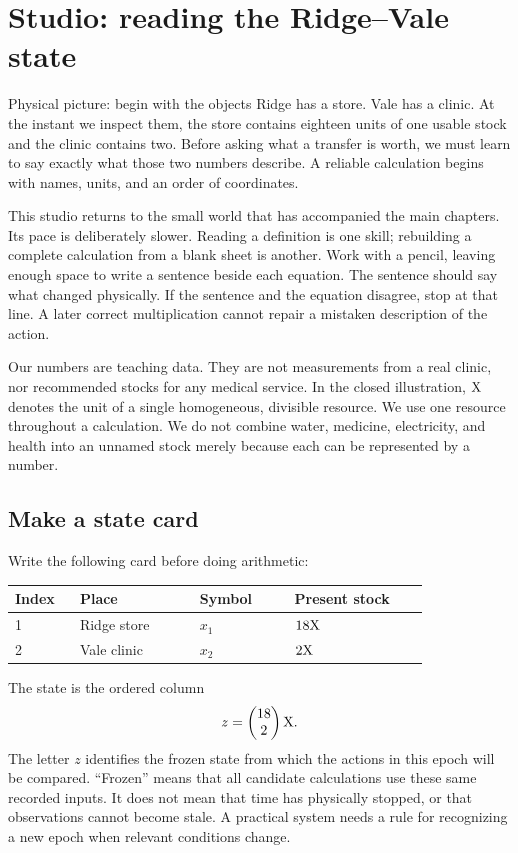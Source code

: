 \chapter{Studio: reading the Ridge--Vale state}\label{ch:studio-state}

\begin{intuitionbox}{Physical picture: begin with the objects}
Ridge has a store. Vale has a clinic. At the instant we inspect them, the store contains eighteen units of one usable stock and the clinic contains two. Before asking what a transfer is worth, we must learn to say exactly what those two numbers describe. A reliable calculation begins with names, units, and an order of coordinates.
\end{intuitionbox}

This studio returns to the small world that has accompanied the main chapters. Its pace is deliberately slower. Reading a definition is one skill; rebuilding a complete calculation from a blank sheet is another. Work with a pencil, leaving enough space to write a sentence beside each equation. The sentence should say what changed physically. If the sentence and the equation disagree, stop at that line. A later correct multiplication cannot repair a mistaken description of the action.

Our numbers are teaching data. They are not measurements from a real clinic, nor recommended stocks for any medical service. In the closed illustration, \(\mathrm{X}\) denotes the unit of a single homogeneous, divisible resource. We use one resource throughout a calculation. We do not combine water, medicine, electricity, and health into an unnamed stock merely because each can be represented by a number.

\section{Make a state card}

Write the following card before doing arithmetic:
\begin{center}
\begin{tabular}{P{0.13\linewidth}P{0.24\linewidth}P{0.19\linewidth}P{0.27\linewidth}}
\toprule
Index & Place & Symbol & Present stock\\
 & Ridge store & \(x_1\) & \(18\mathrm{X}\)\\
2 & Vale clinic & \(x_2\) & \(2\mathrm{X}\)\\
\bottomrule
\end{tabular}
\end{center}
The state is the ordered column
\begin{equation}
z=\begin{pmatrix}18\\2\end{pmatrix}\mathrm{X}.
\end{equation}
The letter \(z\) identifies the frozen state from which the actions in this epoch will be compared. ``Frozen'' means that all candidate calculations use these same recorded inputs. It does not mean that time has physically stopped, or that observations cannot become stale. A practical system needs a rule for recognizing a new epoch when relevant conditions change.

